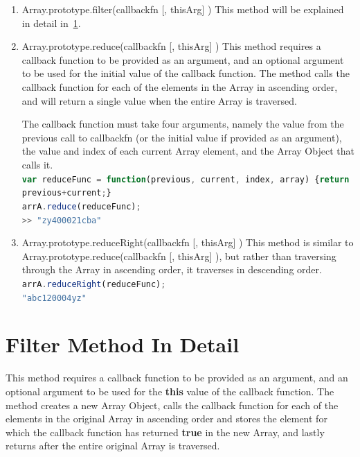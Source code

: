 \documentclass[a4paper,11pt,twoside]{report}
\def\jsinline{\lstinline[language=JavaScript, basicstyle=\small]}%\end{lstlisting}
\begin{document}
\begin{enumerate}
\item Array.prototype.filter(callbackfn [, thisArg] ) \newline
This method will be explained in detail in~\ref{sec:filter}.

\item Array.prototype.reduce(callbackfn [, thisArg] ) \newline
This method requires a callback function to be provided as an argument, and an optional argument to be used for the initial value of the callback function. The method calls the callback function for each of the elements in the Array in ascending order, and will return a single value when the entire Array is traversed.

The callback function must take four arguments, namely the value from the previous call to callbackfn (or the initial value if provided as an argument), the value and index of each current Array element, and the Array Object that calls it. \\
\jsinline|var reduceFunc = function(previous, current, index, array) {return previous+current;}|\\
\jsinline|arrA.reduce(reduceFunc);|\\
\jsinline|>> "zy400021cba"|

\item Array.prototype.reduceRight(callbackfn [, thisArg] ) \newline
This method is similar to Array.prototype.reduce(callbackfn [, thisArg] ), but rather than traversing through the Array in ascending order, it traverses in descending order.\\
\jsinline|arrA.reduceRight(reduceFunc);|\\
\jsinline|"abc120004yz"|
\end{enumerate}

\section{Filter Method In Detail}\label{sec:filter}
This method requires a callback function to be provided as an argument, and an optional argument to be used for the \textbf{this} value of the callback function. The method creates a new Array Object, calls the callback function for each of the elements in the original Array in ascending order and stores the element for which the callback function has returned \textbf{true} in the new Array, and lastly returns after the entire original Array is traversed. 
\end{document}
